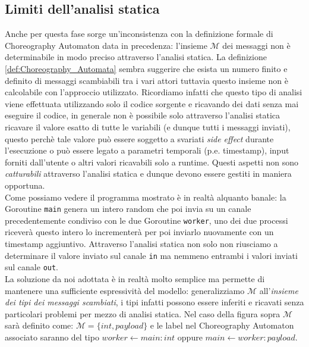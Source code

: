 \subsection{Limiti dell'analisi statica} \label{subsec:Static_Analysis_Limits}
Anche per questa fase sorge un'inconsistenza con la definizione formale di Choreography Automaton data in precedenza: l'insieme $\mathcal{M}$ dei messaggi non è determinabile in modo preciso attraverso l'analisi statica. La definizione \ref{def:Choreography_Automata} sembra suggerire che esista un numero finito e definito di messaggi scambiabili tra i vari attori tuttavia questo insieme non è calcolabile con l'approccio utilizzato.
Ricordiamo infatti che questo tipo di analisi viene effettuata utilizzando solo il codice sorgente e ricavando dei dati senza mai eseguire il codice, in generale non è possibile solo attraverso l'analisi statica ricavare il valore esatto di tutte le variabili (e dunque tutti i messaggi inviati), questo perchè tale valore può essere soggetto a svariati \emph{side effect} durante l'esecuzione o può essere legato a parametri temporali (p.e. timestamp), input forniti dall'utente o altri valori ricavabili solo a runtime. Questi aspetti non sono \emph{catturabili} attraverso l'analisi statica e dunque devono essere  gestiti in maniera opportuna.\\

\bigskip
Come possiamo vedere il programma mostrato è in realtà alquanto banale: la Goroutine \texttt{main} genera un intero random che poi invia su un canale precedentemente condiviso con le due Goroutine \texttt{worker}, uno dei due processi riceverà questo intero lo incrementerà per poi inviarlo nuovamente con un timestamp aggiuntivo. Attraverso l'analisi statica non solo non riusciamo a determinare il valore inviato sul canale \texttt{in} ma nemmeno entrambi i valori inviati sul canale \texttt{out}. \bigskip \\
La soluzione da noi adottata è in realtà molto semplice ma permette di mantenere una sufficiente espressività del modello: generalizziamo $\mathcal{M}$ all'\emph{insieme dei tipi dei messaggi scambiati}, i tipi infatti possono essere inferiti e ricavati senza particolari problemi per mezzo di analisi statica. Nel caso della figura sopra $\mathcal{M}$ sarà definito come: $\mathcal{M} = \{ int, payload \}$ e le label nel Choreography Automaton associato saranno del tipo $worker \leftarrow main : int$ oppure $main \leftarrow worker : payload$.

